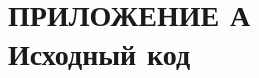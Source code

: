 \documentclass[a4paper,12pt]{article}
\begin{document}
 
	\section*{ПРИЛОЖЕНИЕ А \\ Исходный код}
\end{document}
